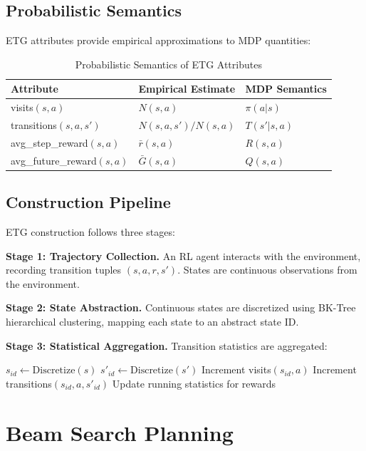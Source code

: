\documentclass[letterpaper]{article}
\begin{document}
\subsection{Probabilistic Semantics}

ETG attributes provide empirical approximations to MDP quantities:

\begin{table}[h]
\centering
\begin{tabular}{lll}
\toprule
\textbf{Attribute} & \textbf{Empirical Estimate} & \textbf{MDP Semantics} \\
\midrule
visits$(s,a)$ & $N(s,a)$ & $\pi(a|s)$ \\
transitions$(s,a,s')$ & $N(s,a,s')/N(s,a)$ & $T(s'|s,a)$ \\
avg\_step\_reward$(s,a)$ & $\bar{r}(s,a)$ & $R(s,a)$ \\
avg\_future\_reward$(s,a)$ & $\bar{G}(s,a)$ & $Q(s,a)$ \\
\bottomrule
\end{tabular}
\caption{Probabilistic Semantics of ETG Attributes}
\end{table}

\subsection{Construction Pipeline}

ETG construction follows three stages:

\textbf{Stage 1: Trajectory Collection.} An RL agent interacts with the environment, recording transition tuples $(s, a, r, s')$. States are continuous observations from the environment.

\textbf{Stage 2: State Abstraction.} Continuous states are discretized using BK-Tree hierarchical clustering, mapping each state to an abstract state ID.

\textbf{Stage 3: Statistical Aggregation.} Transition statistics are aggregated:
\begin{algorithmic}[1]
    \STATE $s_{id} \leftarrow \text{Discretize}(s)$
    \STATE $s'_{id} \leftarrow \text{Discretize}(s')$
    \STATE Increment visits$(s_{id}, a)$
    \STATE Increment transitions$(s_{id}, a, s'_{id})$
    \STATE Update running statistics for rewards
\ENDFOR
\end{algorithmic}

\section{Beam Search Planning}
\end{document}
